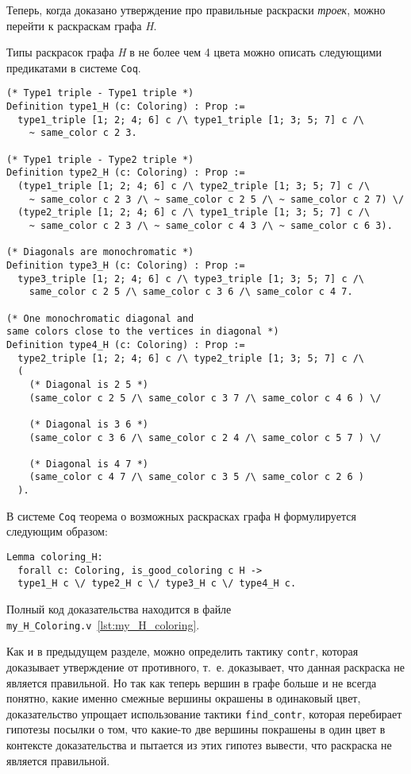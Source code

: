 Теперь, когда доказано утверждение про правильные раскраски {\it троек}, можно перейти к раскраскам графа {\it H}.

Типы раскрасок графа {\it H} в не более чем 4 цвета можно описать следующими предикатами в системе {\tt Coq}.

\begin{verbatim}
(* Type1 triple - Type1 triple *)
Definition type1_H (c: Coloring) : Prop :=
  type1_triple [1; 2; 4; 6] c /\ type1_triple [1; 3; 5; 7] c /\
    ~ same_color c 2 3.

(* Type1 triple - Type2 triple *)
Definition type2_H (c: Coloring) : Prop :=
  (type1_triple [1; 2; 4; 6] c /\ type2_triple [1; 3; 5; 7] c /\
    ~ same_color c 2 3 /\ ~ same_color c 2 5 /\ ~ same_color c 2 7) \/
  (type2_triple [1; 2; 4; 6] c /\ type1_triple [1; 3; 5; 7] c /\
    ~ same_color c 2 3 /\ ~ same_color c 4 3 /\ ~ same_color c 6 3).

(* Diagonals are monochromatic *)
Definition type3_H (c: Coloring) : Prop :=
  type3_triple [1; 2; 4; 6] c /\ type3_triple [1; 3; 5; 7] c /\
    same_color c 2 5 /\ same_color c 3 6 /\ same_color c 4 7.

(* One monochromatic diagonal and 
same colors close to the vertices in diagonal *)
Definition type4_H (c: Coloring) : Prop :=
  type2_triple [1; 2; 4; 6] c /\ type2_triple [1; 3; 5; 7] c /\
  (
    (* Diagonal is 2 5 *) 
    (same_color c 2 5 /\ same_color c 3 7 /\ same_color c 4 6 ) \/

    (* Diagonal is 3 6 *) 
    (same_color c 3 6 /\ same_color c 2 4 /\ same_color c 5 7 ) \/

    (* Diagonal is 4 7 *) 
    (same_color c 4 7 /\ same_color c 3 5 /\ same_color c 2 6 )
  ).
\end{verbatim}

В системе {\tt Coq} теорема о возможных раскрасках графа {\tt H} формулируется следующим образом:

\begin{verbatim}
Lemma coloring_H:
  forall c: Coloring, is_good_coloring c H ->
  type1_H c \/ type2_H c \/ type3_H c \/ type4_H c.
\end{verbatim}

Полный код доказательства находится в файле {\tt my\_H\_Coloring.v}~\ref{lst:my_H_coloring}.

Как и в предыдущем разделе, можно определить тактику {\tt contr}, которая доказывает утверждение от противного, т.~е. доказывает, что данная раскраска не является правильной. Но так как теперь вершин в графе больше и не всегда понятно, какие именно смежные вершины окрашены в одинаковый цвет, доказательство упрощает использование тактики {\tt find\_contr}, которая перебирает гипотезы посылки о том, что какие-то две вершины покрашены в один цвет в контексте доказательства и пытается из этих гипотез вывести, что раскраска не является правильной. 

